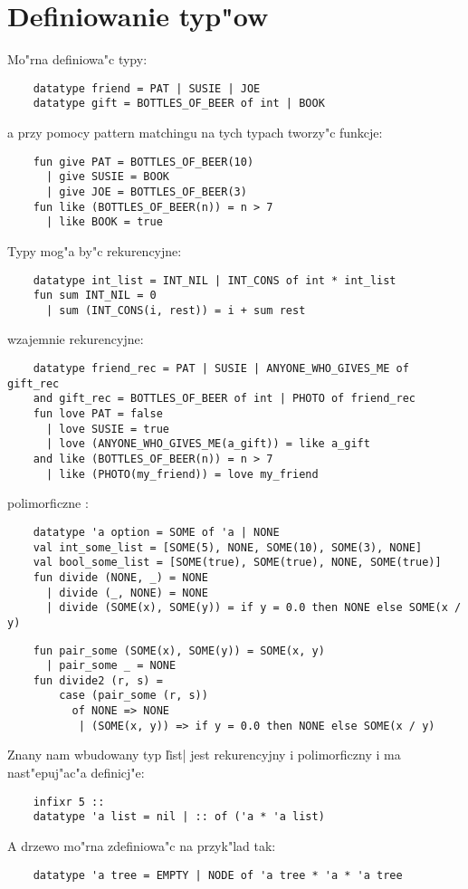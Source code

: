 \chapter{
Definiowanie typ"ow
}

Mo"rna definiowa"c typy:
\begin{verbatim}
    datatype friend = PAT | SUSIE | JOE   
    datatype gift = BOTTLES_OF_BEER of int | BOOK
\end{verbatim}
a przy pomocy pattern matchingu na tych typach tworzy"c funkcje:
\begin{verbatim}
    fun give PAT = BOTTLES_OF_BEER(10)
      | give SUSIE = BOOK
      | give JOE = BOTTLES_OF_BEER(3)
    fun like (BOTTLES_OF_BEER(n)) = n > 7
      | like BOOK = true
\end{verbatim}
Typy mog"a by"c rekurencyjne:
\begin{verbatim}
    datatype int_list = INT_NIL | INT_CONS of int * int_list
    fun sum INT_NIL = 0
      | sum (INT_CONS(i, rest)) = i + sum rest 
\end{verbatim}
wzajemnie rekurencyjne:
\begin{verbatim}
    datatype friend_rec = PAT | SUSIE | ANYONE_WHO_GIVES_ME of gift_rec
    and gift_rec = BOTTLES_OF_BEER of int | PHOTO of friend_rec
    fun love PAT = false
      | love SUSIE = true
      | love (ANYONE_WHO_GIVES_ME(a_gift)) = like a_gift
    and like (BOTTLES_OF_BEER(n)) = n > 7
      | like (PHOTO(my_friend)) = love my_friend
\end{verbatim}
polimorficzne :
\begin{verbatim}
    datatype 'a option = SOME of 'a | NONE
    val int_some_list = [SOME(5), NONE, SOME(10), SOME(3), NONE]
    val bool_some_list = [SOME(true), SOME(true), NONE, SOME(true)]
    fun divide (NONE, _) = NONE
      | divide (_, NONE) = NONE
      | divide (SOME(x), SOME(y)) = if y = 0.0 then NONE else SOME(x / y)
\end{verbatim}

\begin{verbatim}
    fun pair_some (SOME(x), SOME(y)) = SOME(x, y)
      | pair_some _ = NONE
    fun divide2 (r, s) = 
        case (pair_some (r, s)) 
          of NONE => NONE
           | (SOME(x, y)) => if y = 0.0 then NONE else SOME(x / y)
\end{verbatim}

Znany nam wbudowany typ \|list| 
jest rekurencyjny i polimorficzny
i ma nast"epuj"ac"a definicj"e:
\begin{verbatim}
    infixr 5 ::
    datatype 'a list = nil | :: of ('a * 'a list)
\end{verbatim}
A drzewo mo"rna zdefiniowa"c na przyk"lad tak:
\begin{verbatim}
    datatype 'a tree = EMPTY | NODE of 'a tree * 'a * 'a tree
\end{verbatim}


